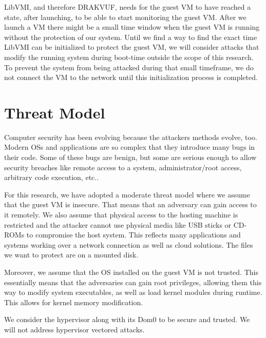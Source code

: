 \par LibVMI, and therefore DRAKVUF, needs for the guest \ac{VM} to have reached a state, after launching, to be able to start monitoring the guest \ac{VM}. After we launch a VM there might be a small time window when the guest \ac{VM} is running without the protection of our system. Until we find a way to find the exact time LibVMI can be initialized to protect the guest \ac{VM}, we will consider attacks that modify the running system during boot-time outside the scope of this research. To prevent the system from being attacked during that small timeframe, we do not connect the \ac{VM} to the network until this initialization process is completed. 

\section{Threat Model}\label{sec:threat}

Computer security has been evolving because the attackers methods evolve, too. Modern \acp{OS} and applications are so complex that they introduce many bugs in their code. Some of these bugs are benign, but some are serious enough to allow security breaches like remote access to a system, administrator/root access, arbitrary code execution, etc..

\par For this research, we have adopted a moderate threat model where we assume that the guest \ac{VM} is insecure. That means that an adversary can gain access to it remotely. We also assume that physical access to the hosting machine is restricted and the attacker cannot use physical media like USB sticks or CD-ROMs to compromise the host system. This reflects many applications and systems working over a network connection as well as cloud solutions. The files we want to protect are on a mounted disk.

\par Moreover, we assume that the \ac{OS} installed on the guest \ac{VM} is not trusted. This essentially means that the adversaries can gain root privileges, allowing them this way to modify system executables, as well as load kernel modules during runtime. This allows for kernel memory modification.

\par We consider the hypervisor along with its Dom0 to be secure and trusted. We will not address hypervisor vectored attacks.

